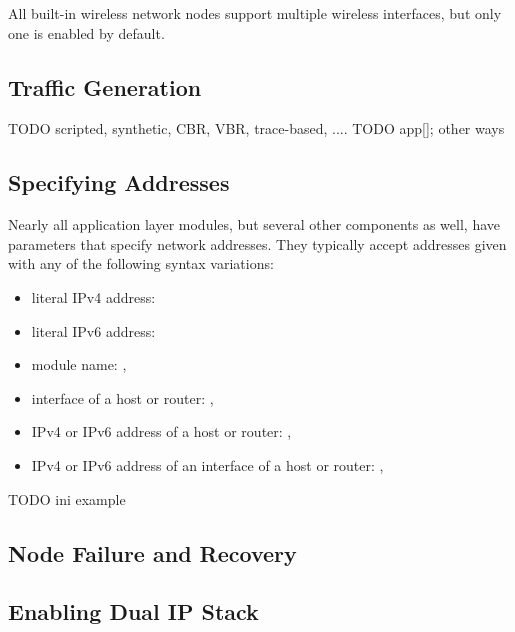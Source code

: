 All built-in wireless network nodes support multiple wireless interfaces,
but only one is enabled by default.


\subsection{Traffic Generation}

TODO scripted, synthetic, CBR, VBR, trace-based, .... 
TODO app[]; other ways 

\subsection{Specifying Addresses}
\label{sec:networks:specifying-addresses}

Nearly all application layer modules, but several other components as well,
have parameters that specify network addresses. They typically accept
addresses given with any of the following syntax variations:

\begin{itemize}
  \item literal IPv4 address: 
  \item literal IPv6 address: 
  \item module name: , 
  \item interface of a host or router: , 
  \item IPv4 or IPv6 address of a host or router: ,
  \item IPv4 or IPv6 address of an interface of a host or router:
      , 
\end{itemize}

TODO ini example


\subsection{Node Failure and Recovery}
\label{sec:networks:node-failure-and-recovery}

\subsection{Enabling Dual IP Stack}
\label{sec:networks:enabling-dual-ip-stack}

